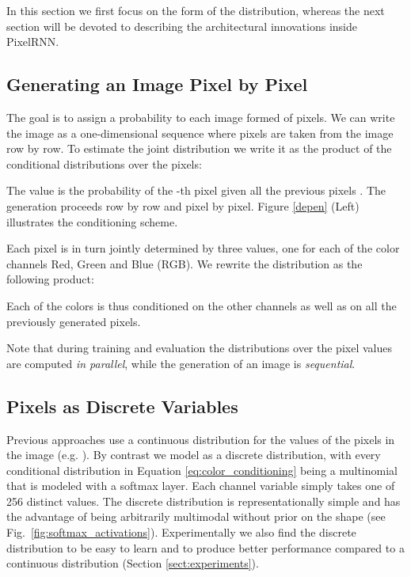 \documentclass{article}
\begin{document}
In this section we first focus on the form of the distribution,
whereas the next section will be devoted to describing the architectural innovations inside PixelRNN.


\subsection{Generating an Image Pixel by Pixel}

The goal is to assign a probability  to each image  formed of  pixels. We can write the image  as a one-dimensional sequence  where pixels are taken from the image row by row. To estimate the joint distribution  we write it as the product of the conditional distributions over the pixels:
\vspace{-0.3cm}

The value  is the probability of the -th pixel  given all the previous pixels . The generation proceeds row by row and pixel by pixel. Figure \ref{depen} (Left) illustrates the conditioning scheme.


Each pixel  is in turn jointly determined by three values, one for each of the color channels Red, Green and Blue (RGB). We rewrite the distribution  as the following product:
 
Each of the colors is thus conditioned on the other channels as well as on all the previously generated pixels. 

Note that during {training} and evaluation the distributions over the pixel values are computed \emph{in parallel}, while the generation of an image is \emph{sequential}. 

\subsection{Pixels as Discrete Variables}

Previous approaches use a continuous distribution for the values of the pixels in the image (e.g. \citet{theis2015generative, uria2013deep}). By contrast we model  as a discrete distribution, with every conditional distribution in Equation \ref{eq:color_conditioning} being a multinomial that is modeled with a softmax layer. Each channel variable  simply takes one of 256 distinct values. The discrete distribution is representationally simple and has the advantage of being arbitrarily multimodal without prior on the shape (see Fig.~\ref{fig:softmax_activations}). Experimentally we also find the discrete distribution to be easy to learn and to produce better performance compared to a continuous distribution (Section \ref{sect:experiments}). 
\end{document}
